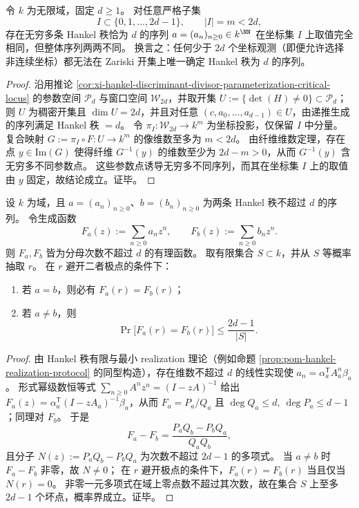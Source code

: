 \begin{theorem}\label{thm:xi-hankel-noncontiguous-sampling-2d-information-lower-bound}
令 \(k\) 为无限域，固定 \(d\ge 1\)。
对任意严格子集
\[
I\subset \{0,1,\dots,2d-1\},
\qquad |I|=m<2d,
\]
存在无穷多条 Hankel 秩恰为 \(d\) 的序列 \(a=(a_n)_{n\ge 0}\in k^{\NN}\) 在坐标集 \(I\) 上取值完全相同，但整体序列两两不同。
换言之：任何少于 \(2d\) 个坐标观测（即便允许选择非连续坐标）都无法在 Zariski 开集上唯一确定 Hankel 秩为 \(d\) 的序列。
\end{theorem}
\begin{proof}
沿用推论 \ref{cor:xi-hankel-discriminant-divisor-parameterization-critical-locus} 的参数空间 \(\mathcal P_d\) 与窗口空间 \(\mathcal W_{2d}\)，并取开集
\(
U:=\{\det(H)\neq 0\}\subset \mathcal P_d
\)；
则 \(U\) 为稠密开集且 \(\dim U=2d\)，并且对任意 \((c,a_0,\dots,a_{d-1})\in U\)，由递推生成的序列满足 Hankel 秩 \(=d\)。
令 \(\pi_I:\mathcal W_{2d}\to k^{m}\) 为坐标投影，仅保留 \(I\) 中分量。
复合映射 \(G:=\pi_I\circ F:U\to k^{m}\) 的像维数至多为 \(m<2d\)。
由纤维维数定理，存在点 \(y\in \mathrm{Im}(G)\) 使得纤维 \(G^{-1}(y)\) 的维数至少为 \(2d-m>0\)，从而 \(G^{-1}(y)\) 含无穷多不同参数点。
这些参数点诱导无穷多不同序列，而其在坐标集 \(I\) 上的取值由 \(y\) 固定，故结论成立。证毕。
\end{proof}

\begin{theorem}\label{thm:xi-hankel-single-point-random-audit}
设 \(k\) 为域，且 \(a=(a_n)_{n\ge 0}\)、\(b=(b_n)_{n\ge 0}\) 为两条 Hankel 秩不超过 \(d\) 的序列。
令生成函数
\[
F_a(z):=\sum_{n\ge 0}a_n z^n,\qquad F_b(z):=\sum_{n\ge 0}b_n z^n.
\]
则 \(F_a,F_b\) 皆为分母次数不超过 \(d\) 的有理函数。
取有限集合 \(S\subset k\)，并从 \(S\) 等概率抽取 \(r\)。
在 \(r\) 避开二者极点的条件下：
\begin{enumerate}
  \item 若 \(a=b\)，则必有 \(F_a(r)=F_b(r)\)；
  \item 若 \(a\neq b\)，则
  \[
  \Pr\bigl[F_a(r)=F_b(r)\bigr]\le \frac{2d-1}{|S|}.
  \]
\end{enumerate}
\end{theorem}
\begin{proof}
由 Hankel 秩有限与最小 realization 理论（例如命题 \ref{prop:pom-hankel-realization-protocol} 的同型构造），存在维数不超过 \(d\) 的线性实现使
\(
a_n=\alpha_a^{\mathsf T}A_a^n\beta_a
\)。
形式幂级数恒等式
\(
\sum_{n\ge 0}A^n z^n=(I-zA)^{-1}
\)
给出
\(
F_a(z)=\alpha_a^{\mathsf T}(I-zA_a)^{-1}\beta_a
\)，从而 \(F_a=P_a/Q_a\) 且 \(\deg Q_a\le d,\ \deg P_a\le d-1\)；同理对 \(F_b\)。
于是
\[
F_a-F_b=\frac{P_aQ_b-P_bQ_a}{Q_aQ_b},
\]
且分子 \(N(z):=P_aQ_b-P_bQ_a\) 为次数不超过 \(2d-1\) 的多项式。
当 \(a\neq b\) 时 \(F_a-F_b\) 非零，故 \(N\neq 0\)；
在 \(r\) 避开极点的条件下，\(F_a(r)=F_b(r)\) 当且仅当 \(N(r)=0\)。
非零一元多项式在域上零点数不超过其次数，故在集合 \(S\) 上至多 \(2d-1\) 个坏点，概率界成立。证毕。
\end{proof}

